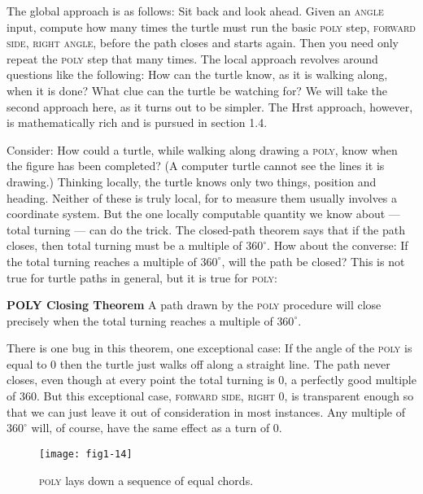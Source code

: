 \documentclass{book}
\begin{document}
The global approach is as follows: Sit back and look ahead. Given an
\textsc{angle} input, compute how many times the turtle must run the basic
\textsc{poly} step, \textsc{forward side}, \textsc{right angle}, before the path closes and
starts again. Then you need only repeat the \textsc{poly} step that many times.
The local approach revolves around questions like the following: How can
the turtle know, as it is walking along, when it is done? What clue can
the turtle be watching for? We will take the second approach here, as it
turns out to be simpler. The Hrst approach, however, is mathematically
rich and is pursued in section 1.4.

Consider: How could a turtle, while walking along drawing a \textsc{poly},
know when the figure has been completed? (A computer turtle cannot
see the lines it is drawing.) Thinking locally, the turtle knows only
two things, position and heading. Neither of these is truly local, for to
measure them usually involves a coordinate system. But the one locally
computable quantity we know about --- total turning --- can do the trick.
The closed-path theorem says that if the path closes, then total turning
must be a multiple of $360^{\circ}$. How about the converse: If the total turning
reaches a multiple of $360^{\circ}$, will the path be closed? This is not true for
turtle paths in general, but it is true for \textsc{poly}:

\vspace{0.5cm}

\noindent \textbf{POLY Closing Theorem} A path drawn by the \textsc{poly} procedure will close
precisely when the total turning reaches a multiple of $360^{\circ}$.

\vspace{0.5cm}

There is one bug in this theorem, one exceptional case: If the angle of
the \textsc{poly} is equal to 0 then the turtle just walks off along a straight
line. The path never closes, even though at every point the total
turning is 0, a perfectly good multiple of 360. But this exceptional case,
\textsc{forward side}, \textsc{right 0}, is transparent enough so that we can just leave
it out of consideration in most instances. Any multiple of $360^{\circ}$ will, of
course, have the same effect as a turn of 0.

\begin{figure}
\begin{center}
\texttt{[image: fig1-14]}
\caption{\textsc{poly} lays down a sequence of equal chords.}
\end{center}
\end{figure}
\end{document}
